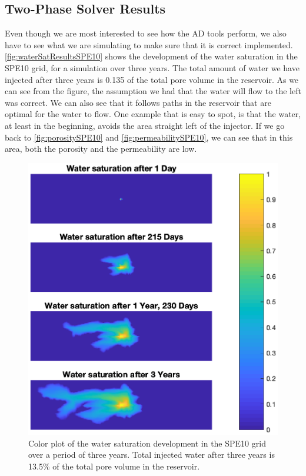 \subsection{Two-Phase Solver Results}
Even though we are most interested to see how the AD tools perform, we also have to see what we are simulating to make sure that it is correct implemented. \autoref{fig:waterSatResultsSPE10} shows the development of the water saturation in the SPE10 grid, for a simulation over three years. The total amount of water we have injected after three years is 0.135 of the total pore volume in the reservoir. As we can see from the figure, the assumption we had that the water will flow to the left was correct. We can also see that it follows paths in the reservoir that are optimal for the water to flow. One example that is easy to spot, is that the water, at least in the beginning, avoids the area straight left of the injector. If we go back to \autoref{fig:porositySPE10} and \autoref{fig:permeabilitySPE10}, we can see that in this area, both the porosity and the permeability are low.
\begin{figure}
    \centering
    \includegraphics[width = .8\textwidth,clip=true, trim=100 30 100 10]{figures/waterSaturation4x1ThreeYears.eps}
    \caption{Color plot of the water saturation development in the SPE10 grid over a period of three years. Total injected water after three years is 13.5\% of the total pore volume in the reservoir.}
    \label{fig:waterSatResultsSPE10}
\end{figure}
